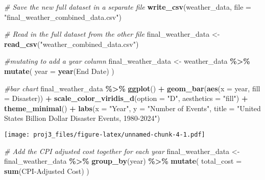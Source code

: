 \documentclass[
]{article}
\newenvironment{Shaded}{\begin{snugshade}}{\end{snugshade}}
\newcommand{\AttributeTok}[1]{\textcolor[rgb]{0.13,0.29,0.53}{#1}}
\newcommand{\CommentTok}[1]{\textcolor[rgb]{0.56,0.35,0.01}{\textit{#1}}}
\newcommand{\FunctionTok}[1]{\textcolor[rgb]{0.13,0.29,0.53}{\textbf{#1}}}
\newcommand{\NormalTok}[1]{#1}
\newcommand{\OtherTok}[1]{\textcolor[rgb]{0.56,0.35,0.01}{#1}}
\newcommand{\SpecialCharTok}[1]{\textcolor[rgb]{0.81,0.36,0.00}{\textbf{#1}}}
\newcommand{\StringTok}[1]{\textcolor[rgb]{0.31,0.60,0.02}{#1}}
\begin{document}
\begin{Shaded}
\begin{Highlighting}[]
\CommentTok{\# Save the new full dataset in a separate file}
\FunctionTok{write\_csv}\NormalTok{(weather\_data, }\AttributeTok{file =} \StringTok{"final\_weather\_combined\_data.csv"}\NormalTok{)}
\end{Highlighting}
\end{Shaded}

\begin{Shaded}
\begin{Highlighting}[]
\CommentTok{\# Read in the full dataset from the other file}
\NormalTok{final\_weather\_data }\OtherTok{\textless{}{-}} \FunctionTok{read\_csv}\NormalTok{(}\StringTok{"weather\_combined\_data.csv"}\NormalTok{)}

\CommentTok{\#mutating to add a year column}
\NormalTok{final\_weather\_data }\OtherTok{\textless{}{-}}\NormalTok{ weather\_data }\SpecialCharTok{\%\textgreater{}\%}
  \FunctionTok{mutate}\NormalTok{(}
    \AttributeTok{year =} \FunctionTok{year}\NormalTok{(}\StringTok{\textasciigrave{}}\AttributeTok{End Date}\StringTok{\textasciigrave{}}\NormalTok{)}
\NormalTok{  )}
\end{Highlighting}
\end{Shaded}

\begin{Shaded}
\begin{Highlighting}[]
\CommentTok{\#bar chart}
\NormalTok{final\_weather\_data }\SpecialCharTok{\%\textgreater{}\%}
  \FunctionTok{ggplot}\NormalTok{() }\SpecialCharTok{+}
  \FunctionTok{geom\_bar}\NormalTok{(}\FunctionTok{aes}\NormalTok{(}\AttributeTok{x =}\NormalTok{ year, }\AttributeTok{fill =}\NormalTok{ Disaster)) }\SpecialCharTok{+}
  \FunctionTok{scale\_color\_viridis\_d}\NormalTok{(}\AttributeTok{option =} \StringTok{"D"}\NormalTok{, }\AttributeTok{aesthetics =} \StringTok{"fill"}\NormalTok{) }\SpecialCharTok{+}
  \FunctionTok{theme\_minimal}\NormalTok{() }\SpecialCharTok{+}
  \FunctionTok{labs}\NormalTok{(}\AttributeTok{x =} \StringTok{"Year"}\NormalTok{, }\AttributeTok{y =} \StringTok{"Number of Events"}\NormalTok{, }\AttributeTok{title =} \StringTok{"United States Billion Dollar Disaster Events, 1980{-}2024"}\NormalTok{)}
\end{Highlighting}
\end{Shaded}

\texttt{[image: proj3\_files/figure-latex/unnamed-chunk-4-1.pdf]}

\begin{Shaded}
\begin{Highlighting}[]
\CommentTok{\# Add the CPI adjusted cost together for each year}
\NormalTok{final\_weather\_data }\OtherTok{\textless{}{-}}\NormalTok{ final\_weather\_data }\SpecialCharTok{\%\textgreater{}\%}
  \FunctionTok{group\_by}\NormalTok{(year) }\SpecialCharTok{\%\textgreater{}\%}
  \FunctionTok{mutate}\NormalTok{(}
    \AttributeTok{total\_cost =} \FunctionTok{sum}\NormalTok{(}\StringTok{\textasciigrave{}}\AttributeTok{CPI{-}Adjusted Cost}\StringTok{\textasciigrave{}}\NormalTok{)}
\NormalTok{  )}
\end{Highlighting}
\end{Shaded}
\end{document}
